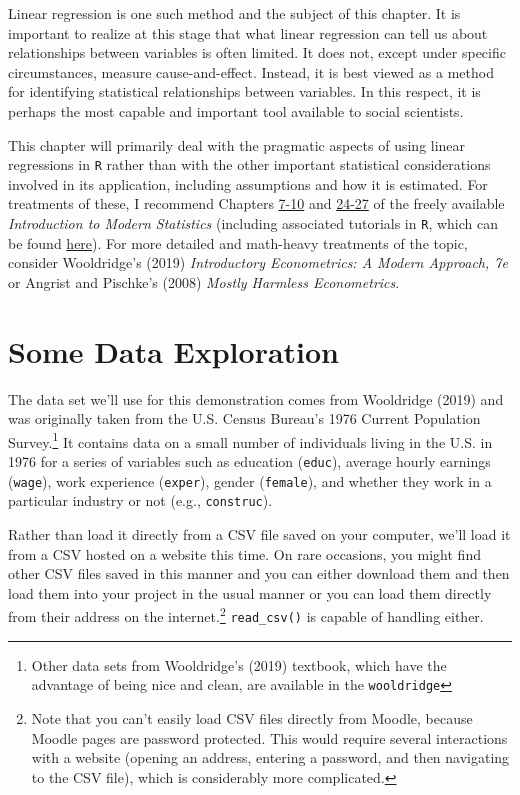 \documentclass[
  letterpaper,
]{book}
\begin{document}
Linear regression is one such method and the subject of this chapter. It
is important to realize at this stage that what linear regression can
tell us about relationships between variables is often limited. It does
not, except under specific circumstances, measure cause-and-effect.
Instead, it is best viewed as a method for identifying statistical
relationships between variables. In this respect, it is perhaps the most
capable and important tool available to social scientists.

This chapter will primarily deal with the pragmatic aspects of using
linear regressions in \texttt{R} rather than with the other important
statistical considerations involved in its application, including
assumptions and how it is estimated. For treatments of these, I
recommend Chapters
\href{https://openintro-ims.netlify.app/model-slr}{7-10} and
\href{https://openintro-ims.netlify.app/inf-model-slr}{24-27} of the
freely available \emph{Introduction to Modern Statistics} (including
associated tutorials in \texttt{R}, which can be found
\href{https://www.openintro.org/book/ims/}{here}). For more detailed and
math-heavy treatments of the topic, consider Wooldridge's (2019)
\emph{Introductory Econometrics: A Modern Approach, 7e} or Angrist and
Pischke's (2008) \emph{Mostly Harmless Econometrics}.

\hypertarget{some-data-exploration}{%
\section{Some Data Exploration}\label{some-data-exploration}}

The data set we'll use for this demonstration comes from Wooldridge
(2019) and was originally taken from the U.S. Census Bureau's 1976
Current Population Survey.\footnote{Other data sets from Wooldridge's
  (2019) textbook, which have the advantage of being nice and clean, are
  available in the \texttt{wooldridge}} It contains data on a small
number of individuals living in the U.S. in 1976 for a series of
variables such as education (\texttt{educ}), average hourly earnings
(\texttt{wage}), work experience (\texttt{exper}), gender
(\texttt{female}), and whether they work in a particular industry or not
(e.g., \texttt{construc}).

Rather than load it directly from a CSV file saved on your computer,
we'll load it from a CSV hosted on a website this time. On rare
occasions, you might find other CSV files saved in this manner and you
can either download them and then load them into your project in the
usual manner or you can load them directly from their address on the
internet.\footnote{Note that you can't easily load CSV files directly
  from Moodle, because Moodle pages are password protected. This would
  require several interactions with a website (opening an address,
  entering a password, and then navigating to the CSV file), which is
  considerably more complicated.} \texttt{read\_csv()} is capable of
handling either.
\end{document}
